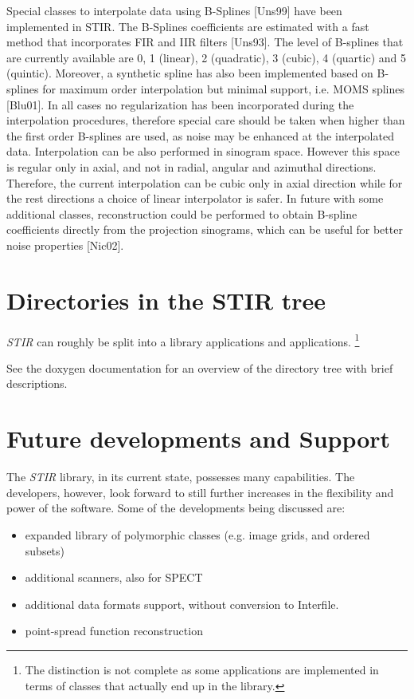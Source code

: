 \documentclass{article}
\begin{document}
{{{\label{sec:BSplines}
Special classes to interpolate data using B-Splines [Uns99] have been implemented in STIR. 
The B-Splines coefficients are estimated with a fast method that incorporates FIR and IIR 
filters [Uns93]. The level of B-splines that are currently available are 0, 1 (linear), 
2 (quadratic), 3 (cubic), 4 (quartic) and 5 (quintic). Moreover, a synthetic spline has also been 
implemented based on B-splines for maximum order interpolation but minimal support, i.e. MOMS 
splines [Blu01]. In all cases no regularization has been incorporated during the interpolation 
procedures, therefore special care should be taken when higher than the first order B-splines 
are used, as noise may be enhanced at the interpolated data. Interpolation can be also performed 
in sinogram space. However this space is regular only in axial, and not in radial, angular and 
azimuthal directions. Therefore, the current interpolation can be cubic only in axial direction 
while for the rest directions a choice of linear interpolator is safer. In future with some 
additional classes, reconstruction could be performed to obtain B-spline coefficients directly 
from the projection sinograms, which can be useful for better noise properties [Nic02].

\section{
Directories in the STIR tree}
\textit{STIR} can roughly be split into a library applications and applications.
\footnote{The distinction is not complete as some applications are implemented
in terms of classes that actually end up in the library.}

See the doxygen documentation for an overview of the directory tree with brief descriptions.

\section{
Future developments and Support}

The \textit{STIR} library, in its current state, possesses many capabilities. 
The developers, however, look forward to still further increases 
in the flexibility and power of the software. Some of the developments 
being discussed are:

\begin{itemize}
\item
expanded library of polymorphic classes (e.g. image grids, and 
ordered subsets)
\item
additional scanners, also for SPECT
\item
additional data formats support, without conversion to Interfile.
\item
point-spread function reconstruction
\end{itemize}


}}}
\end{document}
